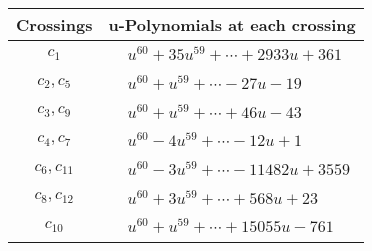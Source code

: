 \documentclass[1p]{elsarticle_modified}
\theoremstyle{definition}
\begin{document}
\begin{tabular}{m{50pt}|m{274pt}}
Crossings & \hspace{64pt}u-Polynomials at each crossing \\
\hline $$\begin{aligned}c_{1}\end{aligned}$$&$\begin{aligned}
&u^{60}+35 u^{59}+\cdots+2933 u+361
\end{aligned}$\\
\hline $$\begin{aligned}c_{2},c_{5}\end{aligned}$$&$\begin{aligned}
&u^{60}+u^{59}+\cdots-27 u-19
\end{aligned}$\\
\hline $$\begin{aligned}c_{3},c_{9}\end{aligned}$$&$\begin{aligned}
&u^{60}+u^{59}+\cdots+46 u-43
\end{aligned}$\\
\hline $$\begin{aligned}c_{4},c_{7}\end{aligned}$$&$\begin{aligned}
&u^{60}-4 u^{59}+\cdots-12 u+1
\end{aligned}$\\
\hline $$\begin{aligned}c_{6},c_{11}\end{aligned}$$&$\begin{aligned}
&u^{60}-3 u^{59}+\cdots-11482 u+3559
\end{aligned}$\\
\hline $$\begin{aligned}c_{8},c_{12}\end{aligned}$$&$\begin{aligned}
&u^{60}+3 u^{59}+\cdots+568 u+23
\end{aligned}$\\
\hline $$\begin{aligned}c_{10}\end{aligned}$$&$\begin{aligned}
&u^{60}+u^{59}+\cdots+15055 u-761
\end{aligned}$\\
\hline
\end{tabular}\\~\\
\newpage\renewcommand{\arraystretch}{1}
\end{document}
